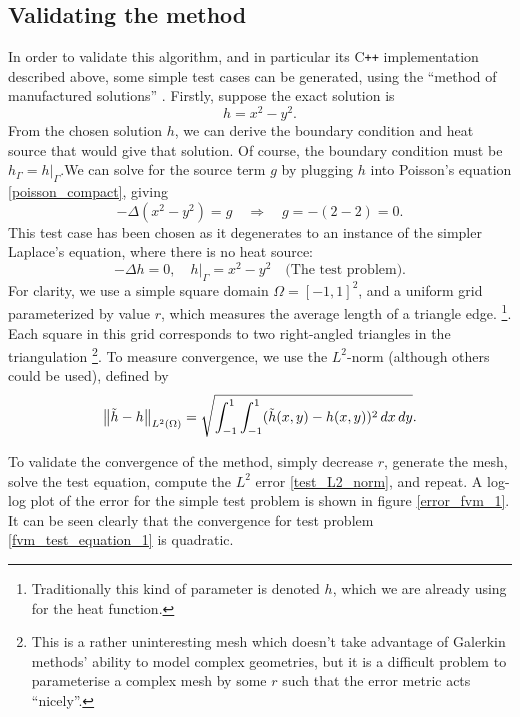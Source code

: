 \subsection{Validating the method}
In order to validate this algorithm, and in particular its C\texttt{++} implementation described above, some simple test cases can be generated,
using the ``method of manufactured solutions'' \cite{fenics_tutorial}.
Firstly, suppose the exact solution is
$$
    h = x^2 - y^2.
$$
From the chosen solution $h$, we can derive the boundary condition and heat source that would give that solution.
Of course, the boundary condition must be $h_\Gamma = \left.h\right|_\Gamma$.We can solve for the source term $g$ by
plugging $h$ into Poisson's equation \eqref{poisson_compact}, giving
$$
    -\Delta\left(x^2 - y^2\right) = g \quad \Rightarrow \quad g = -(2 - 2) = 0.
$$
This test case has been chosen as it degenerates to an instance of the simpler Laplace's equation, where there is no heat source:
\begin{equation}\label{fvm_test_equation_1}
    -\Delta h = 0,\quad \left.h\right|_\Gamma = x^2 - y^2 \quad \text{(The test problem)}.
\end{equation}
For clarity, we use a simple square domain $\Omega = [-1,1]^2$, and a uniform grid parameterized by value $r$, which measures
the average length of a triangle edge.
\footnote{Traditionally this kind of parameter is denoted $h$, which we are already using for the heat function.}.
Each square in this grid
corresponds to two right-angled triangles in the triangulation
\footnote{This is a rather uninteresting mesh which doesn't take advantage
of Galerkin methods' ability to model complex geometries, but it is a difficult problem to parameterise a complex mesh by some $r$ such that the error
metric acts ``nicely''.}.
To measure convergence, we use the $L^2$-norm (although others could be used), defined by
\begin{equation}\label{test_L2_norm}
    \norm{\tilde{h} - h}_{L^2(\Omega)} = \sqrt{\int_{-1}^1\int_{-1}^1 (\tilde{h}(x,y) - h(x,y))^2 \,dx\,dy}.
\end{equation}

To validate the convergence of the method, simply decrease $r$, generate the mesh, solve the test equation,
compute the $L^2$ error \eqref{test_L2_norm}, and repeat. A log-log plot of the error for the simple test problem is shown in figure
\ref{error_fvm_1}.
It can be seen clearly that the convergence for test problem \eqref{fvm_test_equation_1} is quadratic.

